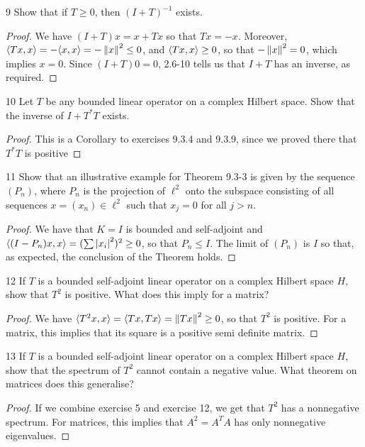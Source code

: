 \begin{exercise}{9}
Show that if $T \geq 0$, then $(I + T)^{-1}$ exists.
\end{exercise}
\begin{proof}
We have $(I + T)x = x + Tx$ so that $Tx = -x$.
Moreover, $\langle Tx, x\rangle = -\langle x, x\rangle = -\left\lVert x\right\rVert^2 \leq 0$, and $\langle Tx, x\rangle \geq 0$, so that $-\left\lVert x\right\rVert^2 = 0$, which implies $x = 0$.
Since $(I + T)0 = 0$, 2.6-10 tells us that $I + T$ has an inverse, as required.
\end{proof} 

\begin{exercise}{10}
Let $T$ be any bounded linear operator on a complex Hilbert space.
Show that the inverse of $I + T^\ast T$ exists.
\end{exercise}
\begin{proof}
This is a Corollary to exercises 9.3.4 and 9.3.9, since we proved there that $T^\ast T$ is positive
\end{proof} 

\begin{exercise}{11}
Show that an illustrative example for Theorem 9.3-3 is given by the sequence $(P_n)$, where $P_n$ is the projection of $\ell^2$ onto the subspace consisting of all sequences $x = (x_n) \in \ell^2$ such that $x_j = 0$ for all $j > n$.
\end{exercise}
\begin{proof}
We have that $K = I$ is bounded and self-adjoint and $\langle (I - P_n)x, x\rangle = (\sum \left\lvert x_i\right\rvert^2)^2 \geq 0$, so that $P_n \leq I$.
The limit of $(P_n)$ is $I$ so that, as expected, the conclusion of the Theorem holds.
\end{proof} 

\begin{exercise}{12}
If $T$ is a bounded self-adjoint linear operator on a complex Hilbert space $H$, show that $T^2$ is positive.
What does this imply for a matrix?
\end{exercise}
\begin{proof}
We have $\langle T^2 x, x\rangle = \langle Tx, Tx\rangle = \left\lVert Tx\right\rVert^2 \geq 0$, so that $T^2$ is positive.
For a matrix, this implies that its square is a positive semi definite matrix.
\end{proof} 

\begin{exercise}{13}
If $T$ is a bounded self-adjoint linear operator on a complex Hilbert space $H$, show that the spectrum of $T^2$ cannot contain a negative value.
What theorem on matrices does this generalise?
\end{exercise}
\begin{proof}
If we combine exercise 5 and exercise 12, we get that $T^2$ has a nonnegative spectrum.
For matrices, this implies that $A^2 = A^T A$ has only nonnegative eigenvalues.
\end{proof} 

